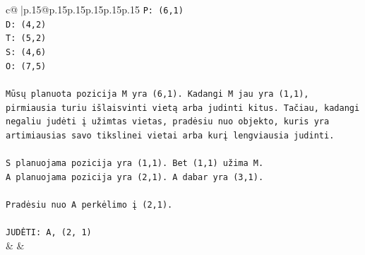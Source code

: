 \documentclass{article}
\begin{document}
{\begin{supertabular}{c@{$\;$}|p{.15\linewidth}@{}p{.15\linewidth}p{.15\linewidth}p{.15\linewidth}p{.15\linewidth}p{.15\linewidth}}
{{{\texttt{P: (6,1)} \\
\texttt{D: (4,2)} \\
\texttt{T: (5,2)} \\
\texttt{S: (4,6)} \\
\texttt{O: (7,5)} \\
\\ 
\texttt{Mūsų planuota pozicija M yra (6,1). Kadangi M jau yra (1,1), pirmiausia turiu išlaisvinti vietą arba judinti kitus. Tačiau, kadangi negaliu judėti į užimtas vietas, pradėsiu nuo objekto, kuris yra artimiausias savo tikslinei vietai arba kurį lengviausia judinti.} \\
\\ 
\texttt{S planuojama pozicija yra (1,1). Bet (1,1) užima M.} \\
\texttt{A planuojama pozicija yra (2,1). A dabar yra (3,1).} \\
\\ 
\texttt{Pradėsiu nuo A perkėlimo į (2,1).} \\
\\ 
\texttt{JUDĖTI: A, (2, 1)} \\
            }
        }
    }
    & & \\ \\


\end{supertabular}}
\end{document}
